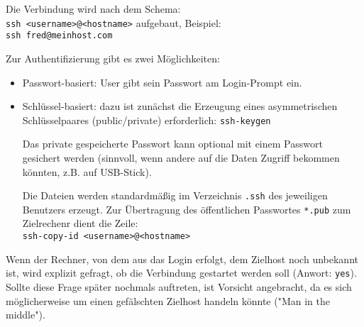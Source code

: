 \documentclass[11pt]{article}
\begin{document}
Die Verbindung wird nach dem Schema:\\ \texttt{ssh <username>@<hostname>} aufgebaut, Beispiel:\\ \texttt{ssh fred@meinhost.com}

Zur Authentifizierung gibt es zwei Möglichkeiten:
\begin{itemize}
  \item Passwort-basiert: User gibt sein Passwort am Login-Prompt ein.
  \item Schlüssel-basiert: dazu ist zunächst die Erzeugung eines asymmetrischen Schlüsselpaares (public/private) erforderlich: \texttt{ssh-keygen}
  
  Das private gespeicherte Passwort kann optional mit einem Passwort gesichert werden (sinnvoll, wenn andere auf die Daten Zugriff bekommen könnten, z.B. auf USB-Stick).

  Die Dateien werden standardmäßig im Verzeichnis \texttt{.ssh} des jeweiligen Benutzers erzeugt. Zur Übertragung des öffentlichen Passwortes \texttt{*.pub} zum Zielrechenr dient die Zeile:\\ \texttt{ssh-copy-id <username>@<hostname>}
\end{itemize}
Wenn der Rechner, von dem aus das Login erfolgt, dem Zielhost noch unbekannt ist, wird explizit gefragt, ob die Verbindung gestartet werden soll (Anwort: \texttt{yes}). Sollte diese Frage später nochmals auftreten, ist Vorsicht angebracht, da es sich möglicherweise um einen gefälschten Zielhost handeln könnte ("Man in the middle").
\end{document}
